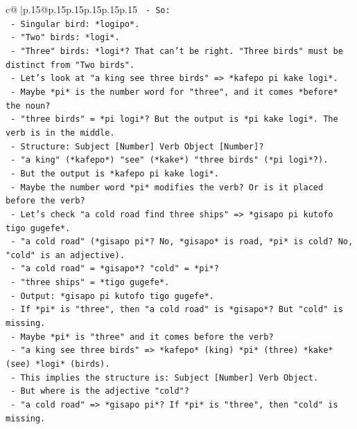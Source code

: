 \documentclass{article}
\begin{document}
{\begin{supertabular}{c@{$\;$}|p{.15\linewidth}@{}p{.15\linewidth}p{.15\linewidth}p{.15\linewidth}p{.15\linewidth}p{.15\linewidth}}
{{{\texttt{      {-} So:} \\
\texttt{        {-} Singular bird: *logipo*.} \\
\texttt{        {-} "Two" birds: *logi*.} \\
\texttt{        {-} "Three" birds: *logi*? That can't be right. "Three birds" must be distinct from "Two birds".} \\
\texttt{        {-} Let's look at "a king see three birds" => *kafepo pi kake logi*.} \\
\texttt{        {-} Maybe *pi* is the number word for "three", and it comes *before* the noun?} \\
\texttt{        {-} "three birds" = *pi logi*? But the output is *pi kake logi*. The verb is in the middle.} \\
\texttt{        {-} Structure: Subject {[}Number{]} Verb Object {[}Number{]}?} \\
\texttt{        {-} "a king" (*kafepo*) "see" (*kake*) "three birds" (*pi logi*?).} \\
\texttt{        {-} But the output is *kafepo pi kake logi*.} \\
\texttt{        {-} Maybe the number word *pi* modifies the verb? Or is it placed before the verb?} \\
\texttt{        {-} Let's check "a cold road find three ships" => *gisapo pi kutofo tigo gugefe*.} \\
\texttt{        {-} "a cold road" (*gisapo pi*? No, *gisapo* is road, *pi* is cold? No, "cold" is an adjective).} \\
\texttt{        {-} "a cold road" = *gisapo*? "cold" = *pi*?} \\
\texttt{        {-} "three ships" = *tigo gugefe*.} \\
\texttt{        {-} Output: *gisapo pi kutofo tigo gugefe*.} \\
\texttt{        {-} If *pi* is "three", then "a cold road" is *gisapo*? But "cold" is missing.} \\
\texttt{        {-} Maybe *pi* is "three" and it comes before the verb?} \\
\texttt{        {-} "a king see three birds" => *kafepo* (king) *pi* (three) *kake* (see) *logi* (birds).} \\
\texttt{        {-} This implies the structure is: Subject {[}Number{]} Verb Object.} \\
\texttt{        {-} But where is the adjective "cold"?} \\
\texttt{        {-} "a cold road" => *gisapo pi*? If *pi* is "three", then "cold" is missing.} \\
}}}
\end{supertabular}}
\end{document}
